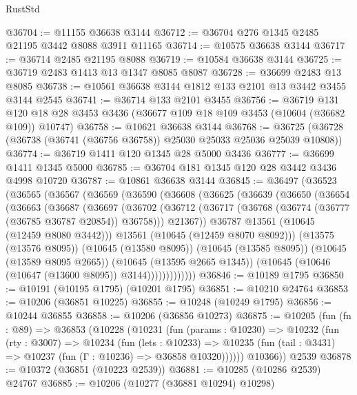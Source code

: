 \begin{lexlean}{RustStd}
\begin{coremodule}
@36704 := @11155 @36638 @3144
@36712 := @36704 @276 @1345 @2485 @21195 @3442 @8088 @3911 @11165
@36714 := @10575 @36638 @3144
@36717 := @36714 @2485 @21195 @8088
@36719 := @10584 @36638 @3144
@36725 := @36719 @2483 @1413 @13 @1347 @8085 @8087
@36728 := @36699 @2483 @13 @8085
@36738 := @10561 @36638 @3144 @1812 @133 @2101 @13 @3442 @3455 @3144 @2545
@36741 := @36714 @133 @2101 @3455
@36756 := @36719
    @131
    @120
    @18
    @28
    @3453
    @3436
    (@36677 @109 @18 @109 @3453 (@10604 (@36682 @109)) @10747)
@36758 := @10621 @36638 @3144
@36768 := @36725 (@36728 (@36738 (@36741 (@36756 @36758)) @25030 @25033 @25036 @25039 @10808))
@36774 := @36719 @1411 @120 @1345 @28 @5000 @3436
@36777 := @36699 @1411 @1345 @5000
@36785 := @36704 @181 @1345 @120 @28 @3442 @3436 @4998 @10720
@36787 := @10861 @36638 @3144
@36845 := @36497
    (@36523
      (@36565
        (@36567
          (@36569
            (@36590
              (@36608
                (@36625
                  (@36639
                    (@36650
                      (@36654
                        (@36663
                          (@36687
                            (@36697
                              (@36702
                                (@36712
                                  (@36717 (@36768 (@36774 (@36777 (@36785 @36787 @20854)) @36758)))
                                  @21367))
                              @36787
                              @13561
                              (@10645 (@12459 @8080 @3442)))
                            @13561
                            (@10645 (@12459 @8070 @8092)))
                          (@13575 (@13576 @8095))
                          (@10645 (@13580 @8095))
                          (@10645 (@13585 @8095))
                          (@10645 (@13589 @8095 @2665))
                          (@10645 (@13595 @2665 @1345))
                          (@10645 (@10646 (@10647 (@13600 @8095)) @3144)))))))))))))
@36846 := @10189 @1795
@36850 := @10191 (@10195 @1795) (@10201 @1795)
@36851 := @10210 @24764
@36853 := @10206 (@36851 @10225)
@36855 := @10248 (@10249 @1795)
@36856 := @10244 @36855
@36858 := @10206 (@36856 @10273)
@36875 := @10205
    (fun (fn : @89) =>
    @36853
      (@10228
        (@10231
          (fun (params : @10230) =>
          @10232
            (fun (rty : @3007) =>
            @10234
              (fun (lets : @10233) =>
              @10235 (fun (tail : @3431) => @10237 (fun (Γ : @10236) => @36858 @10320))))))
        @10366))
    @2539
@36878 := @10372 (@36851 (@10223 @2539))
@36881 := @10285 (@10286 @2539) @24767
@36885 := @10206 (@10277 (@36881 @10294) @10298)

\end{coremodule}
\end{lexlean}
